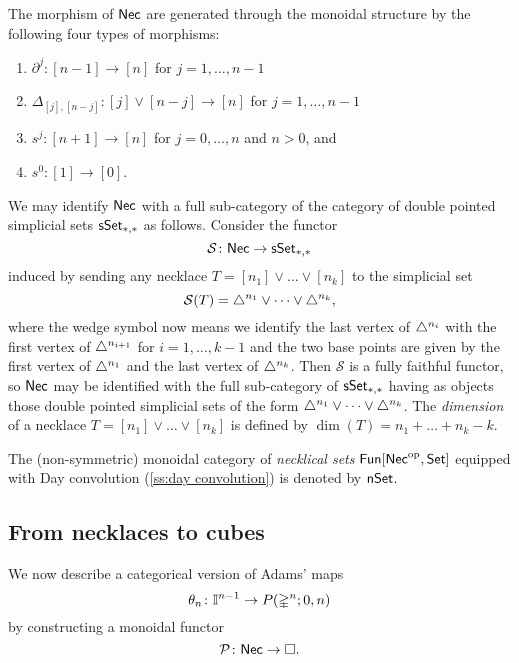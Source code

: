 The morphism of $\mathsf{Nec}$ are generated through the monoidal structure by the following four types of morphisms:
\begin{enumerate}
	\item $\partial^j \colon [n-1] \to [n]$ for $j = 1, \dots, n-1$
	\item $\Delta_{[j], [n-j]} \colon [j] \vee [n-j] \to [n]$ for $j = 1, \dots, n-1$
	\item $s^j \colon [n+1] \to [n]$ for $j = 0, \dots, n$ and $n>0$, and
	\item $s^0 \colon [1] \to [0]$.
\end{enumerate}
We may identify $\mathsf{Nec}$ with a full sub-category of the category of double pointed simplicial sets $\mathsf{sSet}_{*,*}$ as follows.
Consider the functor
\[
\mathcal{S} \colon \mathsf{Nec} \to \mathsf{sSet}_{*,*}
\]
 induced by sending any necklace $T = [n_1] \vee \dots \vee[n_k]$ to the simplicial set
\[
\mathcal{S}(T) = \triangle^{n_1} \vee \dots \vee \triangle^{n_k},
\]
where the wedge symbol now means we identify the last vertex of $\triangle^{n_i}$ with the first vertex of $\triangle^{n_{i+1}}$ for $i = 1, \dots, k-1$ and the two base points are given by the first vertex of $\triangle^{n_1}$ and the last vertex of $\triangle^{n_k}$.
Then $\mathcal{S}$ is a fully faithful functor, so $\mathsf{Nec}$ may be identified with the full sub-category of $\mathsf{sSet}_{*,*}$ having as objects those double pointed simplicial sets of the form $\triangle^{n_1} \vee \dots \vee \triangle^{n_k}$.
The \textit{dimension} of a necklace $T = [n_1] \vee \dots \vee[n_k]$ is defined by $\dim(T) = n_1 + \dots + n_k-k$.

The (non-symmetric) monoidal category of \textit{necklical sets} $\mathsf{Fun}[\mathsf{Nec}^{\mathrm{op}}, \mathsf{Set}]$ equipped with Day convolution (\cref{ss:day convolution}) is denoted by $\mathsf{nSet}$.

\subsection{From necklaces to cubes}

We now describe a categorical version of Adams' maps
\[
\theta_n \colon \mathbb{I}^{n-1} \to P(\mathbb{\Delta}^{n};0,n)
\]
by constructing a monoidal functor
\[
\mathcal{P} \colon \mathsf{Nec} \to \square.
\]

